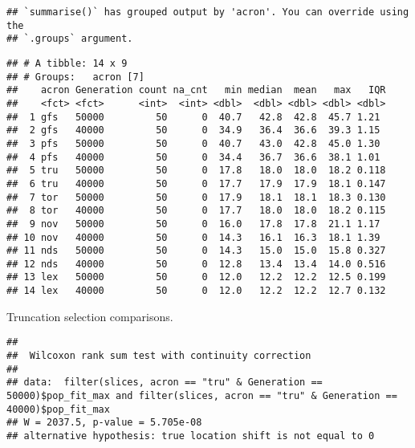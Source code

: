 \documentclass[]{book}
\newenvironment{Shaded}{\begin{snugshade}}{\end{snugshade}}
\newcommand{\DataTypeTok}[1]{\textcolor[rgb]{0.13,0.29,0.53}{#1}}
\newcommand{\DecValTok}[1]{\textcolor[rgb]{0.00,0.00,0.81}{#1}}
\newcommand{\KeywordTok}[1]{\textcolor[rgb]{0.13,0.29,0.53}{\textbf{#1}}}
\newcommand{\NormalTok}[1]{#1}
\newcommand{\OperatorTok}[1]{\textcolor[rgb]{0.81,0.36,0.00}{\textbf{#1}}}
\newcommand{\StringTok}[1]{\textcolor[rgb]{0.31,0.60,0.02}{#1}}
\begin{document}
\begin{verbatim}
## `summarise()` has grouped output by 'acron'. You can override using the
## `.groups` argument.
\end{verbatim}

\begin{verbatim}
## # A tibble: 14 x 9
## # Groups:   acron [7]
##    acron Generation count na_cnt   min median  mean   max   IQR
##    <fct> <fct>      <int>  <int> <dbl>  <dbl> <dbl> <dbl> <dbl>
##  1 gfs   50000         50      0  40.7   42.8  42.8  45.7 1.21 
##  2 gfs   40000         50      0  34.9   36.4  36.6  39.3 1.15 
##  3 pfs   50000         50      0  40.7   43.0  42.8  45.0 1.30 
##  4 pfs   40000         50      0  34.4   36.7  36.6  38.1 1.01 
##  5 tru   50000         50      0  17.8   18.0  18.0  18.2 0.118
##  6 tru   40000         50      0  17.7   17.9  17.9  18.1 0.147
##  7 tor   50000         50      0  17.9   18.1  18.1  18.3 0.130
##  8 tor   40000         50      0  17.7   18.0  18.0  18.2 0.115
##  9 nov   50000         50      0  16.0   17.8  17.8  21.1 1.17 
## 10 nov   40000         50      0  14.3   16.1  16.3  18.1 1.39 
## 11 nds   50000         50      0  14.3   15.0  15.0  15.8 0.327
## 12 nds   40000         50      0  12.8   13.4  13.4  14.0 0.516
## 13 lex   50000         50      0  12.0   12.2  12.2  12.5 0.199
## 14 lex   40000         50      0  12.0   12.2  12.2  12.7 0.132
\end{verbatim}

Truncation selection comparisons.

\begin{Shaded}
\end{Shaded}

\begin{verbatim}
## 
##  Wilcoxon rank sum test with continuity correction
## 
## data:  filter(slices, acron == "tru" & Generation == 50000)$pop_fit_max and filter(slices, acron == "tru" & Generation == 40000)$pop_fit_max
## W = 2037.5, p-value = 5.705e-08
## alternative hypothesis: true location shift is not equal to 0
\end{verbatim}
\end{document}
